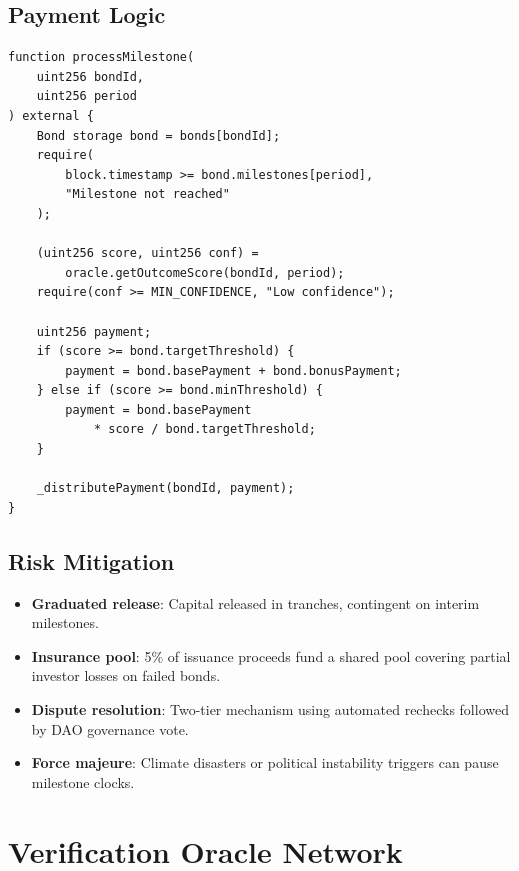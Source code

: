 \documentclass[11pt,a4paper]{article}
\begin{document}
\subsection{Payment Logic}

\begin{lstlisting}[caption={Milestone payment logic.},
  label={lst:payment}]
function processMilestone(
    uint256 bondId,
    uint256 period
) external {
    Bond storage bond = bonds[bondId];
    require(
        block.timestamp >= bond.milestones[period],
        "Milestone not reached"
    );

    (uint256 score, uint256 conf) =
        oracle.getOutcomeScore(bondId, period);
    require(conf >= MIN_CONFIDENCE, "Low confidence");

    uint256 payment;
    if (score >= bond.targetThreshold) {
        payment = bond.basePayment + bond.bonusPayment;
    } else if (score >= bond.minThreshold) {
        payment = bond.basePayment
            * score / bond.targetThreshold;
    }

    _distributePayment(bondId, payment);
}
\end{lstlisting}

\subsection{Risk Mitigation}

\begin{itemize}
  \item \textbf{Graduated release}: Capital released in tranches,
    contingent on interim milestones.
  \item \textbf{Insurance pool}: 5\% of issuance proceeds fund a shared
    pool covering partial investor losses on failed bonds.
  \item \textbf{Dispute resolution}: Two-tier mechanism using automated
    rechecks followed by DAO governance vote.
  \item \textbf{Force majeure}: Climate disasters or political
    instability triggers can pause milestone clocks.
\end{itemize}


\section{Verification Oracle Network}
\label{sec:oracle}
\end{document}
